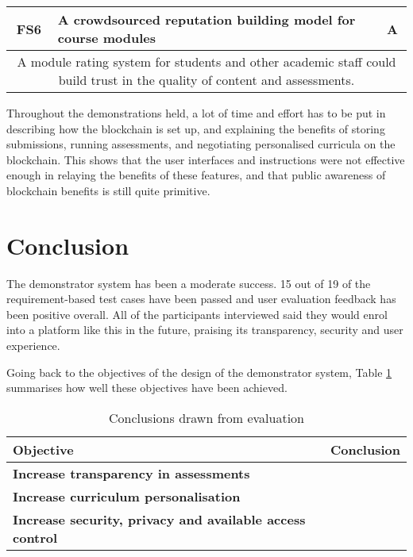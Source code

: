 \begin{table}[!ht]
	\begin{tabularx}{\textwidth}{|c|X|c|}
		\hline
		FS6 & \textbf{A crowdsourced reputation building model for course modules} & A \\
		\hline
		\multicolumn{3}{|X|}{
			A module rating system for students and other academic staff could build trust
			in the quality of content and assessments.
		}                                                                              \\
		\hline
	\end{tabularx}
\end{table}

Throughout the demonstrations held, a lot of time and effort has to be put in describing
how the blockchain is set up, and explaining the benefits of storing submissions,
running assessments, and negotiating personalised curricula on the blockchain.
This shows that the user interfaces and instructions were not effective enough in relaying the
benefits of these features, and that public awareness of blockchain benefits is still quite
primitive.

\section{Conclusion}

The demonstrator system has been a moderate success. 15 out of 19 of the requirement-based test cases have been passed and
user evaluation feedback has been positive overall.
All of the participants interviewed said they would enrol into a platform like this in the future,
praising its transparency, security and user experience.

Going back to the objectives of the design of the demonstrator system,
Table \ref{table:eval_conclusion} summarises how well these objectives have been achieved.

\begin{table}[!ht]
	\caption{Conclusions drawn from evaluation}
	\label{table:eval_conclusion}
	\begin{tabularx}{\textwidth}{|>{\bfseries}X|X|}
		\hline
		Objective & Conclusion
		\\\hline
		Increase transparency in assessments &
		\\\hline
		Increase curriculum personalisation &
		\\\hline	
		Increase security, privacy and available access control &
		\\\hline
	\end{tabularx}
\end{table}



